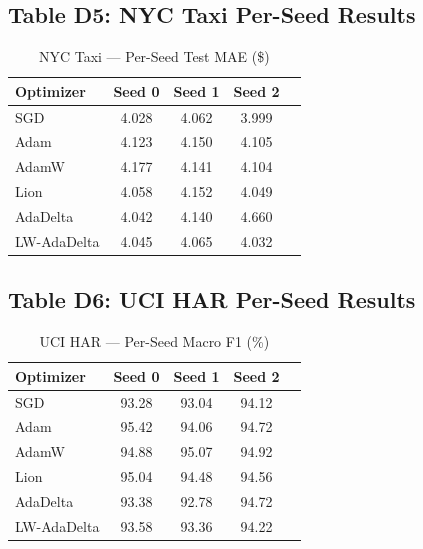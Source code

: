 \documentclass[11pt,a4paper]{article}
\begin{document}
\subsection*{Table D5: NYC Taxi Per-Seed Results}

\begin{table}[H]
\centering
\caption{NYC Taxi --- Per-Seed Test MAE (\$)}
\label{tab:perseed-nyctaxi}
\begin{tabular}{lcccc}
\toprule
\textbf{Optimizer} & \textbf{Seed 0} & \textbf{Seed 1} & \textbf{Seed 2} \\
\midrule
SGD & 4.028 & 4.062 & 3.999 \\
Adam & 4.123 & 4.150 & 4.105 \\
AdamW & 4.177 & 4.141 & 4.104 \\
Lion & 4.058 & 4.152 & 4.049 \\
AdaDelta & 4.042 & 4.140 & 4.660 \\
LW-AdaDelta & 4.045 & 4.065 & 4.032 \\
\bottomrule
\end{tabular}
\end{table}

\subsection*{Table D6: UCI HAR Per-Seed Results}

\begin{table}[H]
\centering
\caption{UCI HAR --- Per-Seed Macro F1 (\%)}
\label{tab:perseed-ucihar}
\begin{tabular}{lcccc}
\toprule
\textbf{Optimizer} & \textbf{Seed 0} & \textbf{Seed 1} & \textbf{Seed 2} \\
\midrule
SGD & 93.28 & 93.04 & 94.12 \\
Adam & 95.42 & 94.06 & 94.72 \\
AdamW & 94.88 & 95.07 & 94.92 \\
Lion & 95.04 & 94.48 & 94.56 \\
AdaDelta & 93.38 & 92.78 & 94.72 \\
LW-AdaDelta & 93.58 & 93.36 & 94.22 \\
\bottomrule
\end{tabular}
\end{table}

\end{document}
